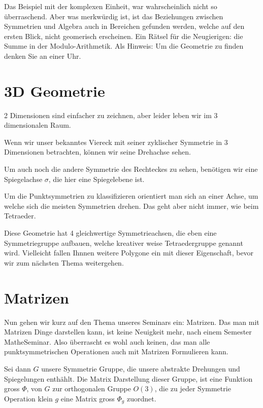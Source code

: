 \documentclass[a4paper]{article}
\newcommand{\scene}[1]{\par\noindent[ #1 ]\par}
\begin{document}
\scene{Modulo}
Das Beispiel mit der komplexen Einheit, war wahrscheinlich nicht so
\"uberraschend. Aber was merkw\"urdig ist, ist das Beziehungen zwischen
Symmetrien und Algebra auch in Bereichen gefunden werden, welche auf den ersten
Blick, nicht geomerisch erscheinen. Ein R\"atsel für die Neugierigen: die Summe
in der Modulo-Arithmetik.  Als Hinweis: Um die Geometrie zu finden denken Sie
an einer Uhr.

\section{3D Geometrie}
2 Dimensionen sind einfacher zu zeichnen, aber leider leben wir im 3
dimensionalen Raum.

\scene{Zyklische Gruppe}
Wenn wir unser bekanntes Viereck mit seiner zyklischer Symmetrie in 3
Dimensionen betrachten, k\"onnen wir seine Drehachse sehen.

\scene{Diedergruppe}
Um auch noch die andere Symmetrie des Rechteckes zu sehen, ben\"otigen wir eine
Spiegelachse \(\sigma\), die hier eine Spiegelebene ist.

\scene{Transition}
Um die Punktsymmetrien zu klassifizieren orientiert man sich an einer Achse, um
welche sich die meisten Symmetrien drehen. Das geht aber nicht immer, wie beim
Tetraeder.

\scene{Tetraedergruppe}
Diese Geometrie hat 4 gleichwertige Symmetrieachsen, die eben eine
Symmetriegruppe aufbauen, welche kreativer weise Tetraedergruppe genannt wird.
Vielleicht fallen Ihnnen weitere Polygone ein mit dieser Eigenschaft, bevor wir
zum n\"achsten Thema weitergehen.

\section{Matrizen}
\scene{Titelseite}
Nun gehen wir kurz auf den Thema unseres Seminars ein: Matrizen.  Das man mit
Matrizen Dinge darstellen kann, ist keine Neuigkeit mehr, nach einem
Semester MatheSeminar.  Also überrascht es wohl auch keinen, das man alle
punktsymmetrischen Operationen auch mit Matrizen Formulieren kann.

\scene{Matrizen}

Sei dann \(G\) unsere Symmetrie Gruppe, die unsere abstrakte Drehungen und
Spiegelungen enth\"ahlt. Die Matrix Darstellung dieser Gruppe, ist eine
Funktion gross \(\Phi\), von \(G\) zur orthogonalen Gruppe \(O(3)\), die zu
jeder Symmetrie Operation klein \(g\) eine Matrix gross \(\Phi_g\) zuordnet.
\end{document}
